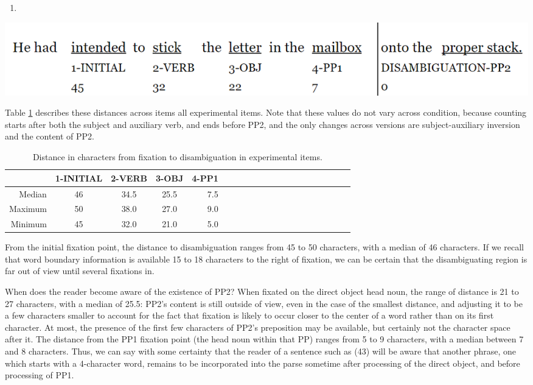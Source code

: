 \documentclass[12pt,oneside]{book}
\begin{document}
\begin{enumerate}
\def\labelenumi{(\arabic{enumi})}
\setcounter{enumi}{42}
\item
\end{enumerate}

\includegraphics{distance-to-cr.png}

Table \ref{tab:dtcs} describes these distances across items all experimental items. Note that these values do not vary across condition, because counting starts after both the subject and auxiliary verb, and ends before PP2, and the only changes across versions are subject-auxiliary inversion and the content of PP2.

\begin{table}[!h]

\caption{\label{tab:dtcs}Distance in characters from fixation to disambiguation in experimental items.}
\centering
\begin{tabular}{rcccrcccrcccrcccrccc}
\toprule
  & 1-INITIAL & 2-VERB & 3-OBJ & 4-PP1\\
\midrule
Median & 46 & 34.5 & 25.5 & 7.5\\
Maximum & 50 & 38.0 & 27.0 & 9.0\\
Minimum & 45 & 32.0 & 21.0 & 5.0\\
\bottomrule
\end{tabular}
\end{table}

From the initial fixation point, the distance to disambiguation ranges from 45 to 50 characters, with a median of 46 characters. If we recall that word boundary information is available 15 to 18 characters to the right of fixation, we can be certain that the disambiguating region is far out of view until several fixations in.

When does the reader become aware of the existence of PP2? When fixated on the direct object head noun, the range of distance is 21 to 27 characters, with a median of 25.5: PP2's content is still outside of view, even in the case of the smallest distance, and adjusting it to be a few characters smaller to account for the fact that fixation is likely to occur closer to the center of a word rather than on its first character. At most, the presence of the first few characters of PP2's preposition may be available, but certainly not the character space after it. The distance from the PP1 fixation point (the head noun within that PP) ranges from 5 to 9 characters, with a median between 7 and 8 characters. Thus, we can say with some certainty that the reader of a sentence such as (43) will be aware that another phrase, one which starts with a 4-character word, remains to be incorporated into the parse sometime after processing of the direct object, and before processing of PP1.
\end{document}
